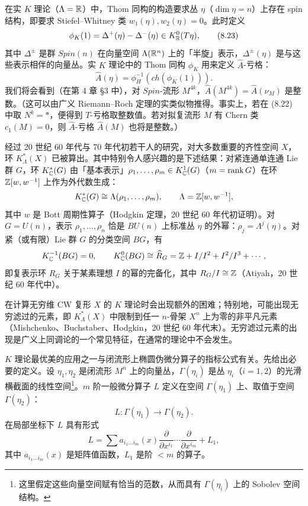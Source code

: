 在实 $K$ 理论（$\Lambda=\mathbb{R}$）中，Thom 同构的构造要求丛 $\eta$（$\dim\eta=n$）上存在 spin 结构，即要求 Stiefel--Whitney 类 $w_1(\eta),w_2(\eta)=0$。此时定义
\begin{equation}
\phi_K(1)=\Delta^+(\eta)-\Delta^-(\eta)\in K_{\mathbb{R}}^0(T\eta), \tag{8.23}
\end{equation}
其中 $\Delta^\pm$ 是群 $Spin(n)$ 在向量空间 $\Lambda(\mathbb{R}^n)$ 上的「半旋」表示，$\Delta^\pm(\eta)$ 是与这些表示相伴的向量丛。实 $K$ 理论中的 Thom 同构 $\phi_K$ 用来定义 $\hat A$-亏格：
\begin{equation}
\hat A(\eta)=\phi_H^{-1}(ch(\phi_K(1))). \tag{8.24}
\end{equation}
我们将会看到（在第 4 章 §3 中），对 $Spin$-流形 $M^{4k}$，$\hat A(M^{4k})=\hat A(\nu_M)$ 是整数。（这可以由广义 Riemann--Roch 定理的实类似物推得。事实上，若在 (8.22) 中取 $N^k=*$，便得到 $T$-亏格取整数值。若对拟复流形 $M$ 有 Chern 类 $c_1(M)=0$，则 $\hat A$-亏格 $\hat A(M)$ 也将是整数。）

经过 20 世纪 60 年代与 70 年代初若干人的研究，对大多数重要的齐性空间 $X$，环 $K_\Lambda^*(X)$ 已被算出。其中特别令人感兴趣的是下述结果：对紧连通单连通 Lie 群 $G$，环 $K_{\mathbb{C}}^*(G)$ 由「基本表示」$\rho_1,\dots,\rho_m\in K_{\mathbb{C}}^1(G)$（$m=\operatorname{rank} G$）在环 $\mathbb{Z}[w,w^{-1}]$ 上作为外代数生成：
\[
K_{\mathbb{C}}^*(G)\cong\Lambda(\rho_1,\dots,\rho_m),\qquad \Lambda=\mathbb{Z}[w,w^{-1}],
\]
其中 $w$ 是 Bott 周期性算子（Hodgkin 定理，20 世纪 60 年代初证明）。对 $G=U(n)$，表示 $\rho_1,\dots,\rho_n$ 恰是 $BU(n)$ 上标准丛 $\eta$ 的外幂：$\rho_j=\Lambda^j(\eta)$。对紧（或有限）Lie 群 $G$ 的分类空间 $BG$，有
\[
K_{\mathbb{C}}^{-1}(BG)=0,\qquad K_{\mathbb{C}}^0(BG)\cong\widehat R_G=\mathbb{Z}+I/I^2+I^2/I^3+\cdots,
\]
即复表示环 $R_G$ 关于某素理想 $I$ 的幂的完备化，其中 $R_G/I\cong\mathbb{Z}$（Atiyah，20 世纪 60 年代中）。

在计算无穷维 CW 复形 $X$ 的 $K$ 理论时会出现额外的困难；特别地，可能出现无穷滤过的元素，即 $K_\Lambda^*(X)$ 中限制到任一 $n$-骨架 $X^n$ 上为零的非平凡元素（Mishchenko、Buchstaber、Hodgkin，20 世纪 60 年代末）。无穷滤过元素的出现是广义上同调论的一个常见特征，在通常的理论中不会发生。

$K$ 理论最优美的应用之一与闭流形上椭圆伪微分算子的指标公式有关。先给出必要的定义。设 $\eta_1,\eta_2$ 是闭流形 $M^n$ 上的向量丛，$\Gamma(\eta_i)$ 是丛 $\eta_i$（$i=1,2$）的光滑横截面的线性空间\footnote{这里假定这些向量空间赋有恰当的范数，从而具有 $\Gamma(\eta_i)$ 上的 Sobolev 空间结构。}。$m$ 阶一般微分算子 $L$ 定义在空间 $\Gamma(\eta_1)$ 上、取值于空间 $\Gamma(\eta_2)$：
\[
L:\Gamma(\eta_1)\longrightarrow\Gamma(\eta_2).
\]
在局部坐标下 $L$ 具有形式
\[
L=\sum a_{i_1\dots i_m}(x)\frac{\partial}{\partial x^{i_1}}\cdots\frac{\partial}{\partial x^{i_m}}+L_1,
\]
其中 $a_{i_1\dots i_m}(x)$ 是矩阵值函数，$L_1$ 是阶 $<m$ 的算子。

